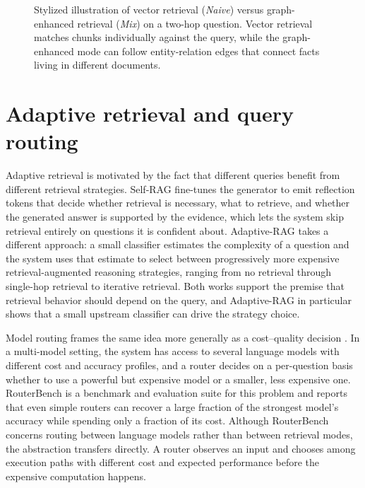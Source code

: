 \documentclass[english, bibtex]{kththesis}               %
\numberwithin{listing}{chapter}
\begin{document}
\begin{figure}[!ht]
\begin{minipage}[t]{0.48\textwidth}
\end{minipage}
\caption{Stylized illustration of vector retrieval (\emph{Naive}) versus graph-enhanced retrieval (\emph{Mix}) on a two-hop question. Vector retrieval matches chunks individually against the query, while the graph-enhanced mode can follow entity-relation edges that connect facts living in different documents.}
\label{fig:vectorVsGraphExample}
\end{figure}

\section{Adaptive retrieval and query routing}
\label{sec:backgroundAdaptiveRetrieval}

Adaptive retrieval is motivated by the fact that different queries benefit from different retrieval strategies. Self-RAG \cite{asai2023selfrag} fine-tunes the generator to emit reflection tokens that decide whether retrieval is necessary, what to retrieve, and whether the generated answer is supported by the evidence, which lets the system skip retrieval entirely on questions it is confident about. Adaptive-RAG \cite{jeong2024adaptiverag} takes a different approach: a small classifier estimates the complexity of a question and the system uses that estimate to select between progressively more expensive retrieval-augmented reasoning strategies, ranging from no retrieval through single-hop retrieval to iterative retrieval. Both works support the premise that retrieval behavior should depend on the query, and Adaptive-RAG in particular shows that a small upstream classifier can drive the strategy choice.

Model routing frames the same idea more generally as a cost--quality decision \cite{hu2024routerbench}. In a multi-model setting, the system has access to several language models with different cost and accuracy profiles, and a router decides on a per-question basis whether to use a powerful but expensive model or a smaller, less expensive one. RouterBench \cite{hu2024routerbench} is a benchmark and evaluation suite for this problem and reports that even simple routers can recover a large fraction of the strongest model's accuracy while spending only a fraction of its cost. Although RouterBench concerns routing between language models rather than between retrieval modes, the abstraction transfers directly. A router observes an input and chooses among execution paths with different cost and expected performance before the expensive computation happens.
\end{document}
